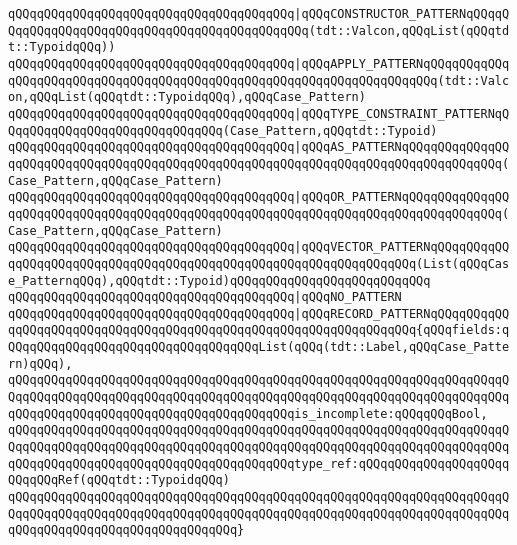 \verb|qQQqqQQqqQQqqQQqqQQqqQQqqQQqqQQqqQQqqQQq|\verb#|qQQqCONSTRUCTOR_PATTERNqQQqqQQqqQQqqQQqqQQqqQQqqQQqqQQqqQQqqQQqqQQqqQQq(tdt::Valcon,qQQqList(qQQqtdt::TypoidqQQq))#\newline
\verb|qQQqqQQqqQQqqQQqqQQqqQQqqQQqqQQqqQQqqQQq|\verb#|qQQqAPPLY_PATTERNqQQqqQQqqQQqqQQqqQQqqQQqqQQqqQQqqQQqqQQqqQQqqQQqqQQqqQQqqQQqqQQqqQQqqQQq(tdt::Valcon,qQQqList(qQQqtdt::TypoidqQQq),qQQqCase_Pattern)#\newline
\verb|qQQqqQQqqQQqqQQqqQQqqQQqqQQqqQQqqQQqqQQq|\verb#|qQQqTYPE_CONSTRAINT_PATTERNqQQqqQQqqQQqqQQqqQQqqQQqqQQqqQQq(Case_Pattern,qQQqtdt::Typoid)#\newline
\verb|qQQqqQQqqQQqqQQqqQQqqQQqqQQqqQQqqQQqqQQq|\verb#|qQQqAS_PATTERNqQQqqQQqqQQqqQQqqQQqqQQqqQQqqQQqqQQqqQQqqQQqqQQqqQQqqQQqqQQqqQQqqQQqqQQqqQQqqQQqqQQq(Case_Pattern,qQQqCase_Pattern)#\newline
\verb|qQQqqQQqqQQqqQQqqQQqqQQqqQQqqQQqqQQqqQQq|\verb#|qQQqOR_PATTERNqQQqqQQqqQQqqQQqqQQqqQQqqQQqqQQqqQQqqQQqqQQqqQQqqQQqqQQqqQQqqQQqqQQqqQQqqQQqqQQqqQQq(Case_Pattern,qQQqCase_Pattern)#\newline
\verb|qQQqqQQqqQQqqQQqqQQqqQQqqQQqqQQqqQQqqQQq|\verb#|qQQqVECTOR_PATTERNqQQqqQQqqQQqqQQqqQQqqQQqqQQqqQQqqQQqqQQqqQQqqQQqqQQqqQQqqQQqqQQqqQQq(List(qQQqCase_PatternqQQq),qQQqtdt::Typoid)qQQqqQQqqQQqqQQqqQQqqQQqqQQq#\newline
\verb|qQQqqQQqqQQqqQQqqQQqqQQqqQQqqQQqqQQqqQQq|\verb#|qQQqNO_PATTERN#\newline
\verb|qQQqqQQqqQQqqQQqqQQqqQQqqQQqqQQqqQQqqQQq|\verb#|qQQqRECORD_PATTERNqQQqqQQqqQQqqQQqqQQqqQQqqQQqqQQqqQQqqQQqqQQqqQQqqQQqqQQqqQQqqQQqqQQq{qQQqfields:qQQqqQQqqQQqqQQqqQQqqQQqqQQqqQQqqQQqList(qQQq(tdt::Label,qQQqCase_Pattern)qQQq),#\newline
\verb|qQQqqQQqqQQqqQQqqQQqqQQqqQQqqQQqqQQqqQQqqQQqqQQqqQQqqQQqqQQqqQQqqQQqqQQqqQQqqQQqqQQqqQQqqQQqqQQqqQQqqQQqqQQqqQQqqQQqqQQqqQQqqQQqqQQqqQQqqQQqqQQqqQQqqQQqqQQqqQQqqQQqqQQqqQQqqQQqqQQqis_incomplete:qQQqqQQqBool,|\newline
\verb|qQQqqQQqqQQqqQQqqQQqqQQqqQQqqQQqqQQqqQQqqQQqqQQqqQQqqQQqqQQqqQQqqQQqqQQqqQQqqQQqqQQqqQQqqQQqqQQqqQQqqQQqqQQqqQQqqQQqqQQqqQQqqQQqqQQqqQQqqQQqqQQqqQQqqQQqqQQqqQQqqQQqqQQqqQQqqQQqqQQqtype_ref:qQQqqQQqqQQqqQQqqQQqqQQqqQQqRef(qQQqtdt::TypoidqQQq)|\newline
\verb|qQQqqQQqqQQqqQQqqQQqqQQqqQQqqQQqqQQqqQQqqQQqqQQqqQQqqQQqqQQqqQQqqQQqqQQqqQQqqQQqqQQqqQQqqQQqqQQqqQQqqQQqqQQqqQQqqQQqqQQqqQQqqQQqqQQqqQQqqQQqqQQqqQQqqQQqqQQqqQQqqQQqqQQqqQQq}|\newline
\newline
